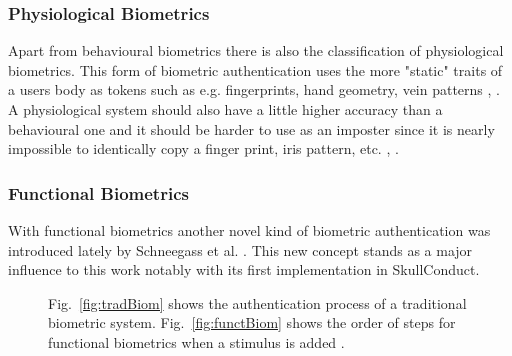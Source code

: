 \subsubsection{Physiological Biometrics} Apart from behavioural biometrics there is also the classification of physiological biometrics.
This form of biometric authentication uses the more "static" traits of a users body as tokens such as e.g. fingerprints, hand geometry, vein patterns \cite{alsaadi2015physiological}, \cite{faltaous2019vpid}.
A physiological system should also have a little higher accuracy than a behavioural one and it should be harder to use as an imposter since it is nearly impossible to identically copy a finger print, iris pattern, etc. \cite{koong2014user}, \cite{delac2004survey}.
\subsubsection{Functional Biometrics} With functional biometrics another novel kind of biometric authentication was introduced lately by Schneegass et al. \cite{schneegass2020functbiometric}.
This new concept stands as a major influence to this work notably with its first implementation in SkullConduct\cite{SkullConduct}. 
\begin{figure}
	\begin{center}
		\hspace{0.5cm}
	\end{center}
	\caption{Fig.~\ref{fig:tradBiom} shows the authentication process of a traditional biometric system. Fig.~\ref{fig:functBiom} shows the order of steps for functional biometrics when a stimulus is added \cite{schneegass2020functbiometric}.}
	\label{fig:biometricsVersions}
\end{figure}
